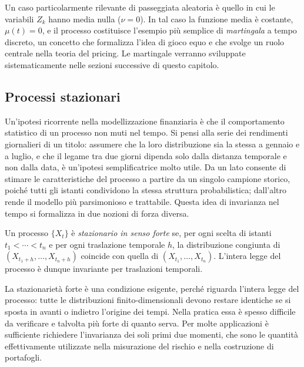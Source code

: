 \begin{remark}
Un caso particolarmente rilevante di passeggiata aleatoria \`{e}
quello in cui le variabili $Z_k$ hanno media nulla ($\nu=0$). In tal
caso la funzione media \`{e} costante, $\mu(t)=0$, e il processo
costituisce l'esempio pi\`{u} semplice di \emph{martingala} a tempo
discreto, un concetto che formalizza l'idea di gioco equo e che svolge
un ruolo centrale nella teoria del pricing. Le martingale verranno sviluppate sistematicamente
nelle sezioni successive di questo capitolo.
\end{remark}

\subsection{Processi stazionari}

\noindent
Un'ipotesi ricorrente nella modellizzazione finanziaria \`{e} che il
comportamento statistico di un processo non muti nel tempo. Si pensi
alla serie dei rendimenti giornalieri di un titolo: assumere che la
loro distribuzione sia la stessa a gennaio e a luglio, e che il legame
tra due giorni dipenda solo dalla distanza temporale e non dalla data,
\`{e} un'ipotesi semplificatrice molto utile. Da un lato consente di
stimare le caratteristiche del processo a partire da un singolo
campione storico, poich\'{e} tutti gli istanti condividono la stessa
struttura probabilistica; dall'altro rende il modello pi\`{u}
parsimonioso e trattabile. Questa idea di invarianza nel tempo si
formalizza in due nozioni di forza diversa.

\begin{definition}
\label{def:stazionario-forte}
Un processo $\{X_t\}$ \`{e} \emph{stazionario in senso forte} se, per
ogni scelta di istanti $t_1<\cdots<t_n$ e per ogni traslazione
temporale $h$, la distribuzione congiunta di
$(X_{t_1+h},\ldots,X_{t_n+h})$ coincide con quella di
$(X_{t_1},\ldots,X_{t_n})$. L'intera legge del processo \`{e} dunque
invariante per traslazioni temporali.
\end{definition}

La stazionariet\`{a} forte \`{e} una condizione esigente, perch\'{e}
riguarda l'intera legge del processo: tutte le distribuzioni
finito-dimensionali devono restare identiche se si sposta in avanti
o indietro l'origine dei tempi. Nella pratica essa \`{e} spesso
difficile da verificare e talvolta pi\`{u} forte di quanto serva. Per
molte applicazioni \`{e} sufficiente richiedere l'invarianza dei soli
primi due momenti, che sono le quantit\`{a} effettivamente utilizzate
nella misurazione del rischio e nella costruzione di portafogli.

